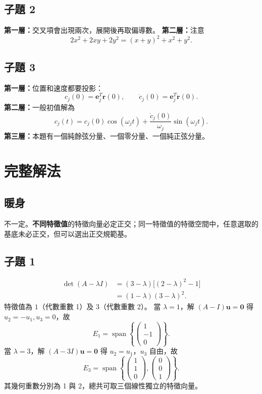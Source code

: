 \documentclass[12pt,a4paper]{article}
\begin{document}
\subsection*{子題 2}
\textbf{第一層：}交叉項會出現兩次，展開後再取偏導數。
\textbf{第二層：}注意
\[
  2x^2+2xy+2y^2=(x+y)^2+x^2+y^2.
\]

\subsection*{子題 3}
\textbf{第一層：}位置和速度都要投影：
\[
  c_j(0)=\mathbf e_j^T\mathbf r(0),\qquad
  \dot c_j(0)=\mathbf e_j^T\dot{\mathbf r}(0).
\]
\textbf{第二層：}一般初值解為
\[
  c_j(t)=c_j(0)\cos(\omega_jt)
  +\frac{\dot c_j(0)}{\omega_j}\sin(\omega_jt).
\]
\textbf{第三層：}本題有一個純餘弦分量、一個零分量、一個純正弦分量。

\clearpage
\section{完整解法}
\subsection*{暖身}
不一定。\textbf{不同特徵值}的特徵向量必定正交；同一特徵值的特徵空間中，任意選取的基底未必正交，但可以選出正交規範基。

\subsection*{子題 1}
\[
  \begin{aligned}
    \det(A-\lambda I)
     & =(3-\lambda)\big[(2-\lambda)^2-1\big] \\
     & =(1-\lambda)(3-\lambda)^2.
  \end{aligned}
\]
特徵值為 \(1\)（代數重數 1）及 \(3\)（代數重數 2）。
當 \(\lambda=1\)，解 \((A-I)\mathbf u=\mathbf0\) 得 \(u_2=-u_1,u_3=0\)，故
\[
  E_1=\operatorname{span}\left\{\begin{pmatrix}1\\-1\\0\end{pmatrix}\right\}.
\]
當 \(\lambda=3\)，解 \((A-3I)\mathbf u=\mathbf0\) 得 \(u_2=u_1\)，\(u_3\) 自由，故
\[
  E_3=\operatorname{span}\left\{
  \begin{pmatrix}1\\1\\0\end{pmatrix},
  \begin{pmatrix}0\\0\\1\end{pmatrix}\right\}.
\]
其幾何重數分別為 1 與 2，總共可取三個線性獨立的特徵向量。
\end{document}
